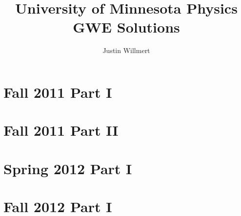 \documentclass[10pt]{article}
\title{University of Minnesota Physics GWE Solutions}
\author{%
	Justin Willmert%
}
\begin{document}
\begingroup
	\small
	\makeatletter
	\let\origstarttoc\@starttoc
	\renewcommand*{\@starttoc}[1]{%
		\begin{multicols}{2}%
			\origstarttoc{#1}%
		\end{multicols}%
	}
	\makeatother
	\tableofcontents

	\printindex
	\clearpage
\endgroup

\section{Fall 2011 Part I}

\clearpage

\section{Fall 2011 Part II}

\clearpage

\section{Spring 2012 Part I}

\clearpage

\section{Fall 2012 Part I}

\clearpage
\end{document}
